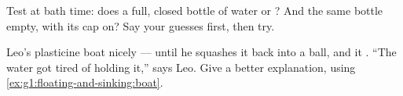 \begin{exercise}[$\star$]\label{exo:g1:floating-and-sinking:8}
Test at bath time: does a full, closed bottle of water  or
? And the same bottle empty, with its cap on? Say your guesses
first, then try.
\end{exercise}

\begin{exercise}[$\star\star$]\label{exo:g1:floating-and-sinking:9}
Leo's plasticine boat  nicely --- until he squashes it back
into a ball, and it . ``The water got tired of holding it,''
says Leo. Give a better explanation, using
\cref{ex:g1:floating-and-sinking:boat}.
\end{exercise}
